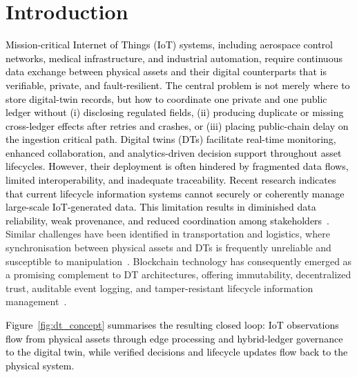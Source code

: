 \documentclass[final,5p,times,twocolumn]{elsarticle}
\begin{document}



\section{\textbf{Introduction}}
\label{int}
\textcolor{black}{Mission-critical Internet of Things (IoT) systems, including aerospace control networks,
medical infrastructure, and industrial automation, require continuous data exchange between
physical assets and their digital counterparts that is verifiable, private, and
fault-resilient. The central problem is not merely where to store digital-twin records, but how to coordinate one private and one public ledger without (i) disclosing regulated fields, (ii) producing duplicate or missing cross-ledger effects after retries and crashes, or (iii) placing public-chain delay on the ingestion critical path. Digital twins (DTs) facilitate real-time monitoring, enhanced
collaboration, and analytics-driven decision support throughout asset lifecycles. However, their
deployment is often hindered by fragmented data flows, limited interoperability, and
inadequate traceability. Recent research indicates that current lifecycle information systems
cannot securely or coherently manage large-scale IoT-generated data. This limitation results in
diminished data reliability, weak provenance, and reduced coordination among
stakeholders~\cite{sadri2023integration}.}
Similar challenges have been identified in transportation and logistics, where
synchronisation between physical assets and DTs is frequently unreliable and susceptible to
manipulation~\cite{cunat2024blockchain}.
Blockchain technology has consequently emerged as a promising complement to DT architectures,
offering immutability, decentralized trust, auditable event logging, and tamper-resistant
lifecycle information management~\cite{kanu2024blockchain}.

\textcolor{black}{Figure~\ref{fig:dt_concept} summarises the resulting closed loop: IoT observations
flow from physical assets through edge processing and hybrid-ledger governance to the digital
twin, while verified decisions and lifecycle updates flow back to the physical system.}
\end{document}
